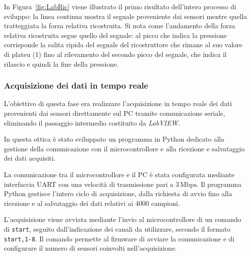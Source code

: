 \documentclass[10pt, a4paper]{article}
\begin{document}
                In Figura~\ref{fig:LabRic} viene illustrato il primo risultato dell'intero processo di sviluppo: la linea continua mostra il segnale proveniente
                dai sensori mentre quella tratteggiata la forza relativa ricostruita. Si nota come l'andamento della forza relativa ricostruita segue quello del segnale:
                al picco che indica la pressione corrisponde la salita ripida del segnale del ricostruttore che rimane al suo valore di plateu (1) fino al rilevamento del
                secondo picco del segnale, che indica il rilascio e quindi la fine della pressione.

            \subsubsection{Acquisizione dei dati in tempo reale}
                L'obiettivo di questa fase era realizzare l'acquisizione in tempo reale dei dati provenienti dai sensori direttamente sul PC tramite comunicazione 
                seriale,
                eliminando il passaggio intermedio costituito da \textit{LabVIEW}. 

                In questa ottica è stato sviluppato un programma in Python dedicato alla gestione della comunicazione con il microcontrollore e alla ricezione e 
                salvataggio dei dati acquisiti.

                La comunicazione tra il microcontrollore e il PC è stata configurata mediante interfaccia UART con una velocità di trasmissione pari a $3\,\mathrm{Mbps}$. 
                Il programma Python gestisce l'intero ciclo di acquisizione, dalla richiesta di avvio fino alla ricezione e al salvataggio dei dati relativi ai 
                4000 campioni.

                L'acquisizione viene avviata mediante l'invio al microcontrollore di un comando di \texttt{start}, seguito dall'indicazione dei canali da utilizzare, secondo il 
                formato \texttt{start,1-8}. Il comando permette al firmware di avviare la comunicazione e di configurare il numero di sensori coinvolti nell'acquisizione.
\end{document}
